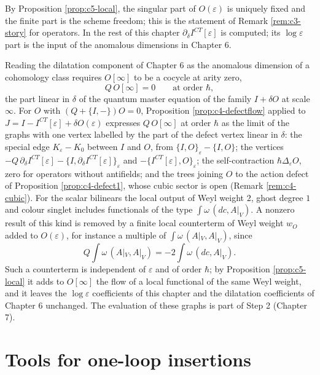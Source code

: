 \begin{remark}
\label{rem:c5-content}
By Proposition \ref{prop:c5-local}, the singular part of $O(\varepsilon)$ is uniquely fixed and the finite part is the scheme freedom; this is the statement of Remark \ref{rem:c3-story} for operators. In the rest of this chapter $\partial_\delta I^{CT}[\varepsilon]$ is computed; its $\log\varepsilon$ part is the input of the anomalous dimensions in Chapter 6.
\end{remark}

\begin{remark}
\label{rem:c5-cocycle}
Reading the dilatation component of Chapter 6 as the anomalous dimension of a cohomology class requires $O[\infty]$ to be a cocycle at arity zero,
\[
Q\,O[\infty]=0\qquad\text{at order }\hbar,
\]
the part linear in $\delta$ of the quantum master equation of the family $I+\delta O$ at scale $\infty$. For $O$ with $(Q+\{I,-\})O=0$, Proposition \ref{prop:c4-defectflow} applied to $J=I-I^{CT}[\varepsilon]+\delta O(\varepsilon)$ expresses $Q\,O[\infty]$ at order $\hbar$ as the limit of the graphs with one vertex labelled by the part of the defect vertex linear in $\delta$: the special edge $K_\varepsilon-K_0$ between $I$ and $O$, from $\{I,O\}_\varepsilon-\{I,O\}$; the vertices $-Q\,\partial_\delta I^{CT}[\varepsilon]-\{I,\partial_\delta I^{CT}[\varepsilon]\}_\varepsilon$ and $-\{I^{CT}[\varepsilon],O\}_\varepsilon$; the self-contraction $\hbar\Delta_\varepsilon O$, zero for operators without antifields; and the trees joining $O$ to the action defect of Proposition \ref{prop:c4-defect1}, whose cubic sector is open (Remark \ref{rem:c4-cubic}). For the scalar bilinears the local output of Weyl weight $2$, ghost degree $1$ and colour singlet includes functionals of the type $\int\omega\,(dc,A|_V)$. A nonzero result of this kind is removed by a finite local counterterm of Weyl weight $w_O$ added to $O(\varepsilon)$, for instance a multiple of $\int\omega\,(A|_V,A|_V)$, since
\[
Q\int\omega\,(A|_V,A|_V)=-2\int\omega\,(dc,A|_V).
\]
Such a counterterm is independent of $\varepsilon$ and of order $\hbar$; by Proposition \ref{prop:c5-local} it adds to $O[\infty]$ the flow of a local functional of the same Weyl weight, and it leaves the $\log\varepsilon$ coefficients of this chapter and the dilatation coefficients of Chapter 6 unchanged. The evaluation of these graphs is part of Step 2 (Chapter 7).
\end{remark}

\section{Tools for one-loop insertions}

